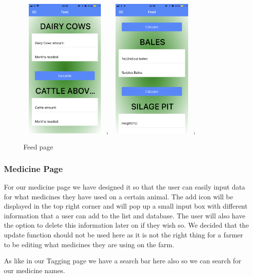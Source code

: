 \documentclass[12pt,a4paper,oneside,openany]{book}
\begin{document}
\begin{figure}[ht]
\renewcommand\thefigure{5.13}
\centering
\includegraphics[width=4.5cm,height=7cm]{Images/feed1.png},
\includegraphics[width=4.5cm,height=7cm]{Images/feed2.png},
\caption{Feed page}
\label{feed}
\end{figure}

\subsubsection{Medicine Page}
For our medicine page we have designed it so that the user can easily input data for what medicines they have used on a certain animal. The add icon will be displayed in the top right corner and will pop up a small input box with different information that a user can add to the list and database. The user will also have the option to delete this information later on if they wish so. We decided that the update function should not be used here as it is not the right thing for a farmer to be editing what medicines they are using on the farm.

As like in our Tagging page we have a search bar here also so we can search for our medicine names.
\end{document}
